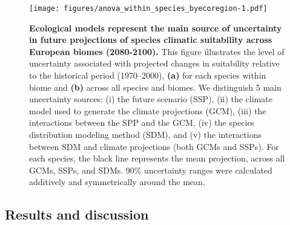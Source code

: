 \documentclass[11pt,letter]{article}
\begin{document}


\begin{figure}
	\centering
	\texttt{[image: figures/anova\_within\_species\_byecoregion-1.pdf]}
	\caption{\textbf{Ecological models represent the main source of uncertainty in future projections of species climatic suitability across European biomes (2080-2100).} This figure illustrates the level of uncertainty associated with projected changes in suitability relative to the historical period (1970–2000), \textbf{(a)} for each species within biome and \textbf{(b)} across all species and biomes. We distinguish 5 main uncertainty sources: (i) the future scenario (SSP), (ii) the climate model used to generate the climate projections (GCM), (iii) the interactions between the SPP and the GCM, (iv) the species distribution modeling method (SDM), and (v) the interactions between SDM and climate projections (both GCMs and SSPs). For each species, the black line represents the mean projection, across all GCMs, SSPs, and SDMs. 90\% uncertainty ranges were calculated additively and symmetrically around the mean.}
	\label{fig:anovaspecies}  %
\end{figure}

\subsection*{Results and discussion}


\end{document}
